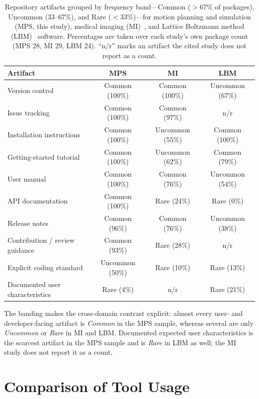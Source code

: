 \begin{table}[H]
\centering
\caption{Repository artifacts grouped by frequency band---Common ($>$67\% of packages), Uncommon (33--67\%), and Rare ($<$33\%)---for motion planning and simulation (MPS, this study), medical imaging (MI)~\citep{Smith2024MI}, and Lattice Boltzmann method (LBM)~\citep{Smith2024LBM} software. Percentages are taken over each study's own package count (MPS 28, MI 29, LBM 24). ``n/r'' marks an artifact the cited study does not report as a count.}
\label{tab:cross-domain-artifact-bands}
\small
\singlespacing
\begin{tabular}{@{}p{4.8cm}ccc@{}}
\toprule
\textbf{Artifact} & \textbf{MPS} & \textbf{MI} & \textbf{LBM} \\
\midrule
Version control                 & Common (100\%)  & Common (100\%)  & Uncommon (67\%) \\
Issue tracking                  & Common (100\%)  & Common (97\%)   & n/r \\
Installation instructions       & Common (100\%)  & Uncommon (55\%) & Common (100\%) \\
Getting-started tutorial        & Common (100\%)  & Uncommon (62\%) & Common (79\%) \\
User manual                     & Common (100\%)  & Common (76\%)   & Uncommon (54\%) \\
API documentation               & Common (100\%)  & Rare (24\%)     & Rare (0\%) \\
Release notes                   & Common (96\%)   & Common (76\%)   & Uncommon (38\%) \\
Contribution / review guidance  & Common (93\%)   & Rare (28\%)     & n/r \\
Explicit coding standard        & Uncommon (50\%) & Rare (10\%)     & Rare (13\%) \\
Documented user characteristics & Rare (4\%)      & n/r             & Rare (21\%) \\
\bottomrule
\end{tabular}
\end{table}

The banding makes the cross-domain contrast explicit: almost every user- and developer-facing artifact is \emph{Common} in the MPS sample, whereas several are only \emph{Uncommon} or \emph{Rare} in MI and LBM. Documented expected user characteristics is the scarcest artifact in the MPS sample and is \emph{Rare} in LBM as well; the MI study does not report it as a count.

\section{Comparison of Tool Usage}
\label{sec:comparison-tools}


